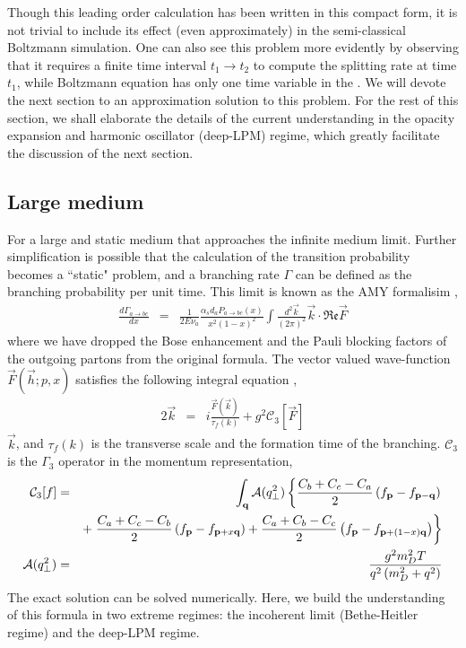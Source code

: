 Though this leading order calculation has been written in this compact form, it is not trivial to include its effect (even approximately) in the semi-classical Boltzmann simulation.
One can also see this problem more evidently by observing that it requires a finite time interval $t_1 \rightarrow t_2$ to compute the splitting rate at time $t_1$, while Boltzmann equation has only one time variable in the . 
We will devote the next section to an approximation solution to this problem.
For the rest of this section, we shall elaborate the details of the current understanding in the opacity expansion and harmonic oscillator (deep-LPM) regime, which greatly facilitate the discussion of the next section.

\subsection{Large medium}
For a large and static medium that approaches the infinite medium limit. 
Further simplification is possible that the calculation of the transition probability becomes a ``static" problem, and a branching rate $\Gamma$ can be defined as the branching probability per unit time.
This limit is known as the AMY formalisim \cite{Arnold:2002ja,Arnold:2002zm,Arnold:2003zc},
\begin{eqnarray}\label{eq:AMY-1}
\nonumber
\frac{d\Gamma_{a\rightarrow bc}}{dx} &=& \frac{1}{2E\nu_a} \frac{\alpha_s d_a P_{a\rightarrow bc}(x)}{x^2(1-x)^2}\int\frac{d^2\vec{k}}{(2\pi)^2}\vec{k}\cdot \mathfrak{Re} \vec{F}
\end{eqnarray}
where we have dropped the Bose enhancement and the Pauli blocking factors of the outgoing partons from the original formula.
The vector valued wave-function $\vec{F}(\vec{h}; p, x)$ satisfies the following integral equation \cite{Arnold:2002ja},
\begin{eqnarray}\label{eq:AMY-2}
\nonumber
2\vec{k} &=& i\frac{\vec{F}(\vec{k})}{\tau_f(k)}  + g^2 \mathcal{C}_3[\vec{F}]
\end{eqnarray} 
$\vec{k}$, and $\tau_f(k)$ is the transverse scale and the formation time of the branching. $\mathcal{C}_3$ is the $\Gamma_3$ operator in the momentum representation,
\begin{eqnarray}
\mathcal{C}_3[f] &=& \int_{\bf q} \mathcal{A}(q_\perp^2)
\left\{  \frac{C_b+C_c-C_a}{2}\left(f_{\bf p}-f_{{\bf p}-{\bf q}}\right) \right.\\\nonumber
&& + \left. \frac{C_a+C_c-C_b}{2}\left(f_{\bf p}-f_{{\bf p}+x{\bf q}}\right) + \frac{C_a+C_b-C_c}{2}\left(f_{\bf p}-f_{{\bf p}+(1-x){\bf q}}\right)\right\}\\
\mathcal{A}(q_\perp^2) &=& \frac{g^2 m_D^2 T}{q^2\left(m_D^2+q^2\right)}
\end{eqnarray}
The exact solution can be solved numerically.
Here, we build the understanding of this formula in two extreme regimes: the incoherent limit (Bethe-Heitler regime) and the deep-LPM regime.

